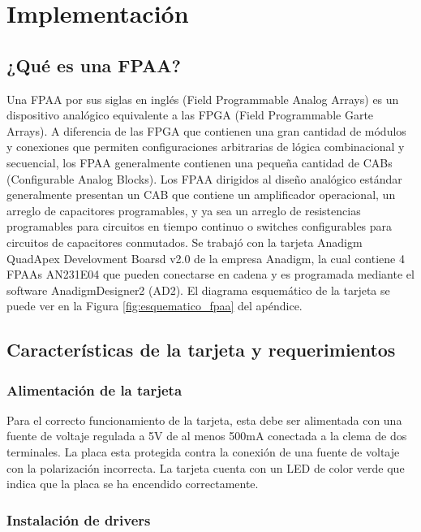 \chapter{Implementación}

	\section{¿Qué es una FPAA?}
	Una FPAA  por sus siglas en inglés (Field Programmable Analog Arrays) es un dispositivo analógico equivalente a las FPGA (Field Programmable Garte Arrays). A diferencia de las FPGA que contienen una gran cantidad de módulos y conexiones que permiten configuraciones arbitrarias de lógica combinacional y secuencial, los FPAA generalmente contienen una pequeña cantidad de CABs (Configurable Analog Blocks). Los FPAA dirigidos al diseño analógico estándar generalmente presentan un CAB que contiene un amplificador operacional, un arreglo de capacitores programables, y ya sea un arreglo de resistencias programables para circuitos en tiempo continuo o switches configurables para circuitos de capacitores conmutados.
	Se trabajó con la tarjeta Anadigm QuadApex Develovment Boarsd v2.0 de la empresa Anadigm, la cual contiene 4 FPAAs AN231E04 que pueden conectarse en cadena y es programada mediante el software AnadigmDesigner2 (AD2). El diagrama esquemático de la tarjeta se puede ver en la Figura \ref{fig:esquematico_fpaa} del apéndice.
	
	\section{Características de la tarjeta y requerimientos}
	
		\subsection{Alimentación de la tarjeta}
	Para el correcto funcionamiento de la tarjeta, esta debe ser alimentada con una fuente de voltaje regulada a 5V de al menos 500mA conectada a la clema de dos terminales. La placa esta protegida contra la conexión de una fuente de voltaje con la polarización incorrecta. La tarjeta cuenta con un LED de color verde que indica que la placa se ha encendido correctamente. 
	
		\subsection{Instalación de drivers}

